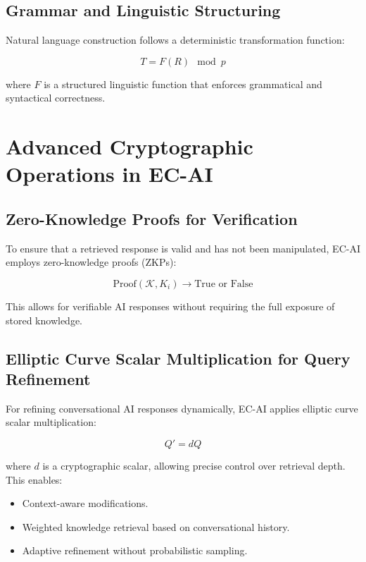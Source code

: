 \documentclass{article}
\begin{document}
\subsection{Grammar and Linguistic Structuring}
Natural language construction follows a deterministic transformation function:

\begin{equation}
T = F(R) \mod p
\end{equation}

where $F$ is a structured linguistic function that enforces grammatical and syntactical correctness.

\section{Advanced Cryptographic Operations in EC-AI}

\subsection{Zero-Knowledge Proofs for Verification}
To ensure that a retrieved response is valid and has not been manipulated, EC-AI employs zero-knowledge proofs (ZKPs):

\begin{equation}
\text{Proof}(\mathcal{K}, K_i) \rightarrow \text{True or False}
\end{equation}

This allows for verifiable AI responses without requiring the full exposure of stored knowledge. 

\subsection{Elliptic Curve Scalar Multiplication for Query Refinement}
For refining conversational AI responses dynamically, EC-AI applies elliptic curve scalar multiplication:

\begin{equation}
Q' = dQ
\end{equation}

where $d$ is a cryptographic scalar, allowing precise control over retrieval depth. This enables:
\begin{itemize}
    \item Context-aware modifications.
    \item Weighted knowledge retrieval based on conversational history.
    \item Adaptive refinement without probabilistic sampling.
\end{itemize}
\end{document}
